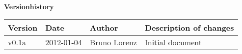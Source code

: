 \Large \textbf{Versionhistory}\\

\newcommand{\versionrow}[4]{
    \small #1 &
    \small #2 &
    \small #3 &
    \small #4 \\
}



\begin{tabular}{l l l l}
    \hline
    \versionrow{\textbf{Version}}{\textbf{Date}}{\textbf{Author}}{\textbf{Description of changes}}
    \hline
    \versionrow{v0.1a}{2012-01-04}{Bruno Lorenz}{Initial document}
\end{tabular}

